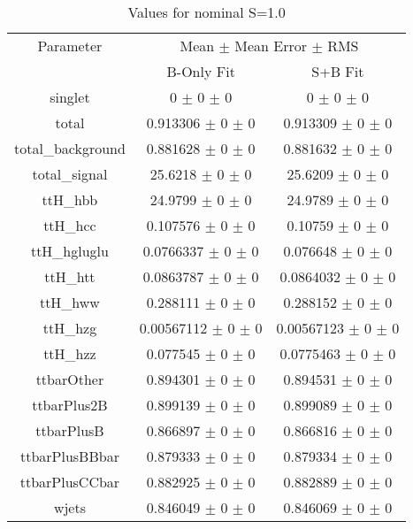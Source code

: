 \begin{table}
\centering
\caption{Values for nominal S=1.0}
\begin{tabular}{ccc}
\toprule
Parameter 	& \multicolumn{2}{c}{Mean $\pm$ Mean Error $\pm$ RMS}\\
 	& B-Only Fit & S+B Fit\\
\midrule
singlet 	& \num{0} $\pm$ \num{0} $\pm$ \num{0} 	& \num{0} $\pm$ \num{0} $\pm$ \num{0}\\
total 	& \num{0.913306} $\pm$ \num{0} $\pm$ \num{0} 	& \num{0.913309} $\pm$ \num{0} $\pm$ \num{0}\\
total\_background 	& \num{0.881628} $\pm$ \num{0} $\pm$ \num{0} 	& \num{0.881632} $\pm$ \num{0} $\pm$ \num{0}\\
total\_signal 	& \num{25.6218} $\pm$ \num{0} $\pm$ \num{0} 	& \num{25.6209} $\pm$ \num{0} $\pm$ \num{0}\\
ttH\_hbb 	& \num{24.9799} $\pm$ \num{0} $\pm$ \num{0} 	& \num{24.9789} $\pm$ \num{0} $\pm$ \num{0}\\
ttH\_hcc 	& \num{0.107576} $\pm$ \num{0} $\pm$ \num{0} 	& \num{0.10759} $\pm$ \num{0} $\pm$ \num{0}\\
ttH\_hgluglu 	& \num{0.0766337} $\pm$ \num{0} $\pm$ \num{0} 	& \num{0.076648} $\pm$ \num{0} $\pm$ \num{0}\\
ttH\_htt 	& \num{0.0863787} $\pm$ \num{0} $\pm$ \num{0} 	& \num{0.0864032} $\pm$ \num{0} $\pm$ \num{0}\\
ttH\_hww 	& \num{0.288111} $\pm$ \num{0} $\pm$ \num{0} 	& \num{0.288152} $\pm$ \num{0} $\pm$ \num{0}\\
ttH\_hzg 	& \num{0.00567112} $\pm$ \num{0} $\pm$ \num{0} 	& \num{0.00567123} $\pm$ \num{0} $\pm$ \num{0}\\
ttH\_hzz 	& \num{0.077545} $\pm$ \num{0} $\pm$ \num{0} 	& \num{0.0775463} $\pm$ \num{0} $\pm$ \num{0}\\
ttbarOther 	& \num{0.894301} $\pm$ \num{0} $\pm$ \num{0} 	& \num{0.894531} $\pm$ \num{0} $\pm$ \num{0}\\
ttbarPlus2B 	& \num{0.899139} $\pm$ \num{0} $\pm$ \num{0} 	& \num{0.899089} $\pm$ \num{0} $\pm$ \num{0}\\
ttbarPlusB 	& \num{0.866897} $\pm$ \num{0} $\pm$ \num{0} 	& \num{0.866816} $\pm$ \num{0} $\pm$ \num{0}\\
ttbarPlusBBbar 	& \num{0.879333} $\pm$ \num{0} $\pm$ \num{0} 	& \num{0.879334} $\pm$ \num{0} $\pm$ \num{0}\\
ttbarPlusCCbar 	& \num{0.882925} $\pm$ \num{0} $\pm$ \num{0} 	& \num{0.882889} $\pm$ \num{0} $\pm$ \num{0}\\
wjets 	& \num{0.846049} $\pm$ \num{0} $\pm$ \num{0} 	& \num{0.846069} $\pm$ \num{0} $\pm$ \num{0}\\
\bottomrule
\end{tabular}
\end{table}